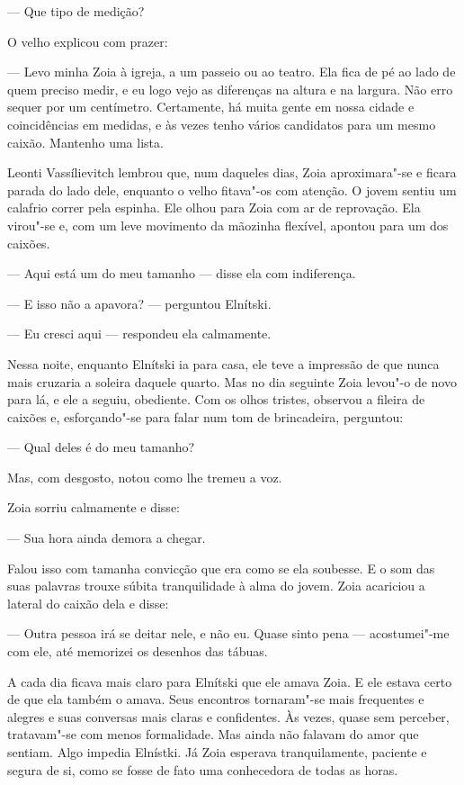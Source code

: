 --- Que tipo de medição?

O velho explicou com prazer:

--- Levo minha Zoia à igreja, a um passeio ou ao teatro. Ela fica de pé
ao lado de quem preciso medir, e eu logo vejo as diferenças na altura e
na largura. Não erro sequer por um centímetro. Certamente, há muita
gente em nossa cidade e coincidências em medidas, e às vezes tenho
vários candidatos para um mesmo caixão. Mantenho uma lista.

Leonti Vassílievitch lembrou que, num daqueles dias, Zoia aproximara"-se
e ficara parada do lado dele, enquanto o velho fitava"-os com atenção. O
jovem sentiu um calafrio correr pela espinha. Ele olhou para Zoia com ar
de reprovação. Ela virou"-se e, com um leve movimento da mãozinha
flexível, apontou para um dos caixões.

--- Aqui está um do meu tamanho --- disse ela com indiferença.

--- E isso não a apavora? --- perguntou Elnítski.

--- Eu cresci aqui --- respondeu ela calmamente.

Nessa noite, enquanto Elnítski ia para casa, ele teve a impressão de que
nunca mais cruzaria a soleira daquele quarto. Mas no dia seguinte Zoia
levou"-o de novo para lá, e ele a seguiu, obediente. Com os olhos
tristes, observou a fileira de caixões e, esforçando"-se para falar
num tom de brincadeira, perguntou:

--- Qual deles é do meu tamanho?

Mas, com desgosto, notou como lhe tremeu a voz.

Zoia sorriu calmamente e disse:

--- Sua hora ainda demora a chegar.

Falou isso com tamanha convicção que era como se ela soubesse. E o som
das suas palavras trouxe súbita tranquilidade à alma do jovem. Zoia
acariciou a lateral do caixão dela e disse:

--- Outra pessoa irá se deitar nele, e não eu. Quase sinto pena ---
acostumei"-me com ele, até memorizei os desenhos das tábuas.

A cada dia ficava mais claro para Elnítski que ele amava Zoia. E ele
estava certo de que ela também o amava. Seus encontros tornaram"-se mais
frequentes e alegres e suas conversas mais claras e confidentes. Às
vezes, quase sem perceber, tratavam"-se com menos formalidade. Mas ainda
não falavam do amor que sentiam. Algo impedia Elnístki. Já Zoia esperava
tranquilamente, paciente e segura de si, como se fosse de fato uma
conhecedora de todas as horas.

